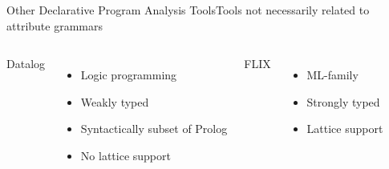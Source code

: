 \begin{frame}{Other Declarative Program Analysis Tools}{Tools not necessarily related to attribute grammars}

\begin{columns}
\alert{Datalog}
\begin{itemize}
    \item Logic programming
    \item Weakly typed
    \item Syntactically subset of Prolog
    \item No lattice support
\end{itemize}
\alert{FLIX}
\begin{itemize}
    \item ML-family
    \item Strongly typed
    \item Lattice support
\end{itemize}
\end{columns}

\end{frame}

